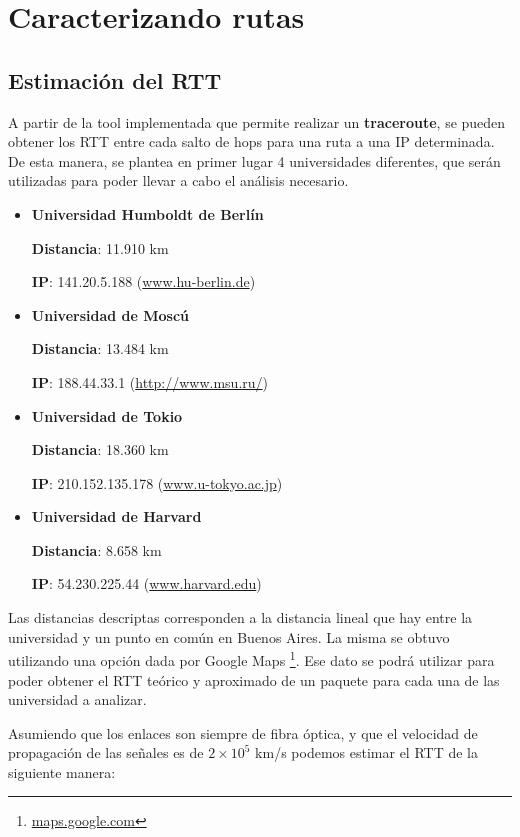 \section{Caracterizando rutas}

\subsection{Estimación del RTT}
A partir de la tool implementada que permite realizar un \textbf{traceroute}, se pueden obtener los RTT entre cada salto de hops para una ruta a una IP determinada. De esta manera, se plantea en primer lugar 4 universidades diferentes, que serán utilizadas para poder llevar a cabo el análisis necesario.

\begin{itemize}
 \item {\bf Universidad Humboldt de Berlín}
 
	{\bf Distancia}: 11.910 km 
	
	{\bf IP}: 141.20.5.188 (\url{www.hu-berlin.de}{})
 
 \item {\bf Universidad de Moscú}

	{\bf Distancia}: 13.484 km
	
	{\bf IP}: 188.44.33.1 (\url{http://www.msu.ru/}{})

 \item {\bf Universidad de Tokio}

	{\bf Distancia}: 18.360 km
	
	{\bf IP}: 210.152.135.178 (\url{www.u-tokyo.ac.jp}{}) 

 \item {\bf Universidad de Harvard}

	{\bf Distancia}: 8.658 km 
	
	{\bf IP}: 54.230.225.44 (\url{www.harvard.edu}{})

\end{itemize}

Las distancias descriptas corresponden a la distancia lineal que hay entre la universidad y un punto en común en Buenos Aires. La misma se obtuvo utilizando una opción dada por Google Maps \footnote{\url{maps.google.com}{}}. Ese dato se podrá utilizar para poder obtener el RTT teórico y aproximado de un paquete para cada una de las universidad a analizar. 

Asumiendo que los enlaces son siempre de fibra óptica, y que el velocidad de propagación de las señales es de $2 \times 10^{5}$ km/s podemos estimar el RTT de la siguiente manera: 

